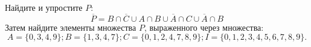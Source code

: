 \question
Найдите и упростите $P$:
\begin{equation*}
\overline{P} = B \cap \overline{C} \cup A \cap B \cup \overline{A} \cap C \cup \overline{A} \cap B
\end{equation*}
Затем найдите элементы множества $P$, выраженного через множества:
\begin{equation*}
	A = \{0, 3, 4, 9\}; 
	B = \{1, 3, 4, 7\};
	C = \{0, 1, 2, 4, 7, 8, 9\};
	I = \{0, 1, 2, 3, 4, 5, 6, 7, 8, 9\}.
\end{equation*}